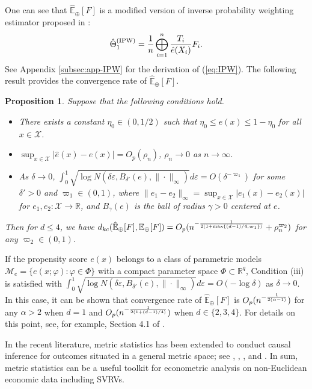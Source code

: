 \documentclass[11pt,reqno]{amsart}
\newtheorem{proposition}{Proposition}
\begin{document}
One can see that $\hat{\mathbb{E}}_\oplus[F]$ is a modified version of inverse probability weighting estimator proposed in \cite{KuZhOtMu24}: 
\begin{align}\label{eq:IPW}
\hat{\Theta}_1^{(\mathrm{IPW})}={1 \over n} \bigoplus_{i=1}^n {T_i \over \hat{e}(X_i)} F_i. 
\end{align} 
See Appendix \ref{subsec:app-IPW} for the derivation of (\ref{eq:IPW}). The following result provides the convergence rate of $\hat{\mathbb{E}}_\oplus[F]$.
\begin{proposition}\label{prp:IPW-conv}
Suppose that the following conditions hold.  
\begin{itemize}
\item[(i)] There exists a constant $\eta_0 \in (0,1/2)$ such that $\eta_0 \leq e(x) \leq 1-\eta_0$ for all $x \in \mathcal{X}$.
\item[(ii)] $\sup_{x \in \mathcal{X}}|\hat{e}(x)-e(x)|=O_p(\rho_n)$, $\rho_n \to 0$ as $n \to \infty$. 
\item[(iii)] As $\delta \to 0$, $\int_0^1 \sqrt{\log N(\delta \varepsilon, B_{\delta'}(e), \|\cdot\|_\infty)}d\varepsilon = O(\delta^{-\varpi_1})$ for some $\delta'>0$ and $\varpi_1 \in (0,1)$, where $\|e_1-e_2\|_\infty=\sup_{x \in \mathcal{X}}|e_1(x)-e_2(x)|$ for $e_1, e_2: \mathcal{X} \to \mathbb{R}$, and $B_\gamma(e)$ is the ball of radius $\gamma>0$ centered at $e$. 
\end{itemize}
Then for $d\leq 4$, we have $d_{kc}(\hat{\mathbb{E}}_\oplus[F], \mathbb{E}_\oplus[F]) = O_p(n^{-{1 \over 2(1 + \max\{(d-1)/4,\varpi_1\})}} + \rho_n^{\varpi_2})$ for any $\varpi_2 \in (0,1)$. 
\end{proposition} 
If the propensity score $e(x)$ belongs to a class of parametric models $\mathcal{M}_e=\{e(x;\varphi): \varphi \in \Phi\}$ with a compact parameter space $\Phi \subset \mathbb{R}^q$, Condition (iii) is satisfied with $\int_0^1 \sqrt{\log N(\delta \varepsilon, B_{\delta'}(e), \|\cdot\|_\infty)}d\varepsilon = O(-\log\delta)$ as $\delta \to 0$. In this case, it can be shown that convergence rate of $\hat{\mathbb{E}}_\oplus[F]$ is $O_p(n^{-{1 \over 2(\alpha-1)}})$ for any $\alpha >2$ when $d=1$ and $O_p(n^{-{1 \over 2(1 + (d-1)/4)}})$ when $d \in \{2,3,4\}$. For details on this point, see, for example, Section 4.1 of \cite{KuZhOtMu24}. 

In the recent literature, metric statistics has been extended to conduct causal inference for outcomes situated in a general metric space; see \cite{KuZhOtMu24}, \cite{ZhKuOtMu25}, \cite{KuZhOtMu25a, KuZhOtMu25b}, and \cite{BhLiWuXu25}. In sum, metric statistics can be a useful toolkit for econometric analysis on non-Euclidean economic data including SVRVs.
\end{document}
